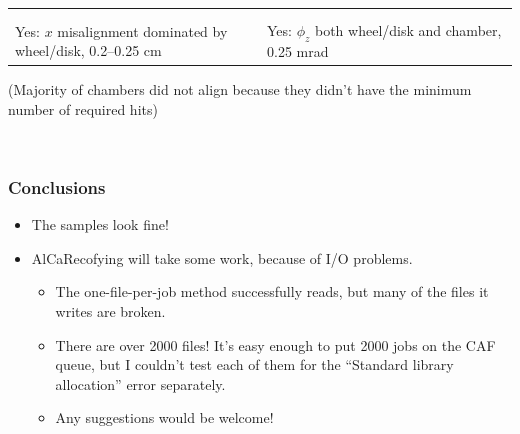 \documentclass[compress]{beamer}
\begin{document}
\begin{frame}
\begin{center}
\begin{tabular}{p{0.5\linewidth} p{0.5\linewidth}}
\begin{minipage}{\linewidth}
\end{minipage} \\
 & \\
\begin{minipage}{\linewidth}
Yes: $x$ misalignment dominated by wheel/disk, 0.2--0.25 cm
\end{minipage} &
\begin{minipage}{\linewidth}
Yes: $\phi_z$ both wheel/disk and chamber, 0.25 mrad
\end{minipage}
\end{tabular}
\end{center}

\vfill \vfill (Majority of chambers did not align because they didn't have the
minimum number of required hits)

\vfill \mbox{ }
\end{frame}

\begin{frame}
\frametitle{Conclusions}

\begin{itemize}\setlength{\itemsep}{0.75 cm}
\item The samples look fine!

\item AlCaRecofying will take some work, because of I/O problems.

\begin{itemize}\setlength{\itemsep}{0.5 cm}

\vspace{0.25 cm}
\item The one-file-per-job method successfully reads, but many of the
files it writes are broken.

\item There are over 2000 files!  It's easy enough to put 2000 jobs on
the CAF queue, but I couldn't test each of them for the ``Standard
library allocation'' error separately.

\item Any suggestions would be welcome!
\end{itemize}

\end{itemize}

\label{numpages}
\end{frame}
\end{document}
